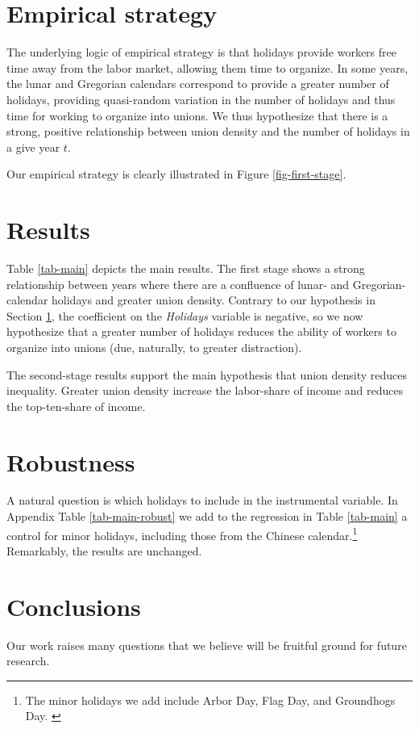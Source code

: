 \documentclass[12pt,pdftex, notitlepage]{article}
\begin{document}
\begin{refsection}
\section{Empirical strategy}\label{sec-strategy}

The underlying logic of empirical strategy is that holidays provide workers free time away from the labor market, allowing them time to organize.  In some years, the lunar and Gregorian calendars correspond to provide a greater number of holidays, providing quasi-random variation in the number of holidays and thus time for working to organize into unions.  We thus hypothesize that there is a strong, positive relationship between union density and the number of holidays in a give year $t$.

Our empirical strategy is clearly illustrated in Figure \ref{fig-first-stage}.

\section{Results}\label{sec-results}

Table \ref{tab-main} depicts the main results.  The first stage shows a strong relationship between years where there are a confluence of lunar- and Gregorian-calendar holidays and greater union density.  Contrary to our hypothesis in Section \ref{sec-strategy}, the coefficient on the \textit{Holidays} variable is negative, so we now hypothesize that a greater number of holidays reduces the ability of workers to organize into unions (due, naturally, to greater distraction).

The second-stage results support the main hypothesis that union density reduces inequality.  Greater union density increase the labor-share of income and reduces the top-ten-share of income.

\section{Robustness}\label{sec-robust}

A natural question is which holidays to include in the instrumental variable.  In Appendix Table \ref{tab-main-robust} we add to the regression in Table \ref{tab-main} a control for minor holidays, including those from the Chinese calendar.\footnote{The minor holidays we add include Arbor Day, Flag Day, and Groundhogs Day. \label{minor-holidays}}  Remarkably, the results are unchanged.

\section{Conclusions}

Our work raises many questions that we believe will be fruitful ground for future research.  


\singlespacing

\printbibliography
\end{refsection}
\end{document}
